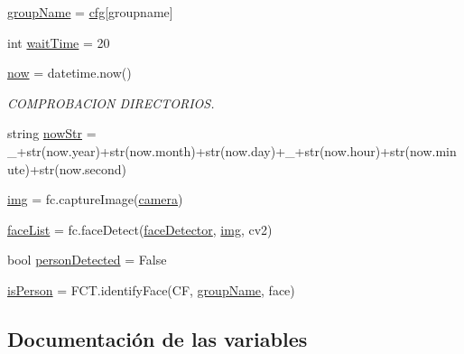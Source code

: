 \begin{DoxyCompactItemize}
\item 
\mbox{\hyperlink{namespace_face_recon_ae44f8e751a650fcfa6bc7d2a61242cc1}{group\+Name}} = \mbox{\hyperlink{namespace_face_recon_a6a0cb127a374ad0eb5705d0f49a40040}{cfg}}\mbox{[}\textquotesingle{}groupname\textquotesingle{}\mbox{]}
\item 
int \mbox{\hyperlink{namespace_face_recon_a1cec4fb530e8a7a1b10ac48890f36e7b}{wait\+Time}} = 20
\item 
\mbox{\hyperlink{namespace_face_recon_ac1dfb5855321e10d5338ad161bfa8151}{now}} = datetime.\+now()
\begin{DoxyCompactList}\small\item\em C\+O\+M\+P\+R\+O\+B\+A\+C\+I\+ON D\+I\+R\+E\+C\+T\+O\+R\+I\+OS. \end{DoxyCompactList}\item 
string \mbox{\hyperlink{namespace_face_recon_af54252e1ad4d24d516c64eaaa88905ce}{now\+Str}} = \textquotesingle{}\+\_\+\textquotesingle{}+str(now.\+year)+str(now.\+month)+str(now.\+day)+\textquotesingle{}\+\_\+\textquotesingle{}+str(now.\+hour)+str(now.\+minute)+str(now.\+second)
\item 
\mbox{\hyperlink{namespace_face_recon_a65dbfeade36a516a4fbd5cd1c44c5682}{img}} = fc.\+capture\+Image(\mbox{\hyperlink{namespace_face_recon_ac6ec5c173cf48f7c65fc970e1e079ca9}{camera}})
\item 
\mbox{\hyperlink{namespace_face_recon_aaf2856e061dd5456e2ff875905fcc51b}{face\+List}} = fc.\+face\+Detect(\mbox{\hyperlink{namespace_face_recon_a52d7b32070be8a278850cdb6afd2d301}{face\+Detector}}, \mbox{\hyperlink{namespace_face_recon_a65dbfeade36a516a4fbd5cd1c44c5682}{img}}, cv2)
\item 
bool \mbox{\hyperlink{namespace_face_recon_ac4b8075620307b113830af1893363bbe}{person\+Detected}} = False
\item 
\mbox{\hyperlink{namespace_face_recon_ad661554f5aa9213b00b4d791a65a29eb}{is\+Person}} = F\+C\+T.\+identify\+Face(CF, \mbox{\hyperlink{namespace_face_recon_ae44f8e751a650fcfa6bc7d2a61242cc1}{group\+Name}}, face)
\end{DoxyCompactItemize}


\subsection{Documentación de las variables}
\mbox{\label{namespace_face_recon_ac6ec5c173cf48f7c65fc970e1e079ca9}} 
